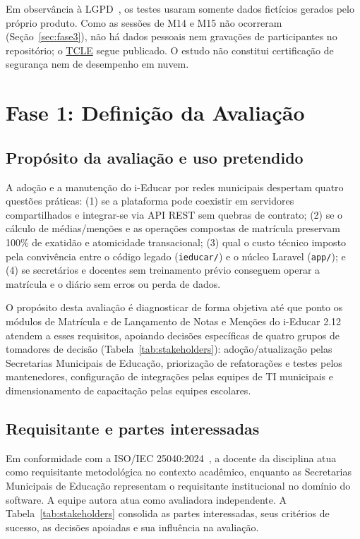 \documentclass[conference]{model/IEEEtran}%
\begin{document}
Em observância à LGPD~\cite{lgpd2018}, os testes usaram somente dados fictícios gerados pelo próprio produto. Como as sessões de M14 e M15 não ocorreram (Seção~\ref{sec:fase3}), não há dados pessoais nem gravações de participantes no repositório; o \href{https://fcte-qualidade-de-software-1.github.io/2026-2_T02_GRACE_HOPPER/termo_consentimento_livre_esclarecido/}{TCLE} segue publicado. O estudo não constitui certificação de segurança nem de desempenho em nuvem.

\section{Fase 1: Definição da Avaliação}\label{sec:fase1}

\subsection{Propósito da avaliação e uso pretendido}
A adoção e a manutenção do i-Educar por redes municipais despertam quatro questões práticas: (1) se a plataforma pode coexistir em servidores compartilhados e integrar-se via API REST sem quebras de contrato; (2) se o cálculo de médias/menções e as operações compostas de matrícula preservam 100\% de exatidão e atomicidade transacional; (3) qual o custo técnico imposto pela convivência entre o código legado (\texttt{ieducar/}) e o núcleo Laravel (\texttt{app/}); e (4) se secretários e docentes sem treinamento prévio conseguem operar a matrícula e o diário sem erros ou perda de dados.

O propósito desta avaliação é diagnosticar de forma objetiva até que ponto os módulos de Matrícula e de Lançamento de Notas e Menções do i-Educar 2.12 atendem a esses requisitos, apoiando decisões específicas de quatro grupos de tomadores de decisão (Tabela~\ref{tab:stakeholders}): adoção/atualização pelas Secretarias Municipais de Educação, priorização de refatorações e testes pelos mantenedores, configuração de integrações pelas equipes de TI municipais e dimensionamento de capacitação pelas equipes escolares.

\subsection{Requisitante e partes interessadas}
Em conformidade com a ISO/IEC 25040:2024~\cite{iso25040}, a docente da disciplina atua como requisitante metodológica no contexto acadêmico, enquanto as Secretarias Municipais de Educação representam o requisitante institucional no domínio do software. A equipe autora atua como avaliadora independente. A Tabela~\ref{tab:stakeholders} consolida as partes interessadas, seus critérios de sucesso, as decisões apoiadas e sua influência na avaliação.
\end{document}
